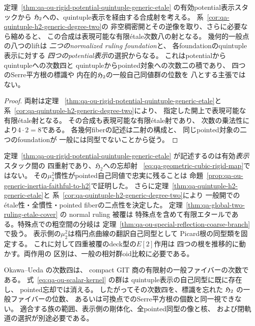 \begin{corollary}[potential表示から内在的pointed対象への一般次数八]
\label{cor:qa-potential-h2-generic-degree-eight}
定理~\ref{thm:qa-ou-rigid-potential-quintuple-generic-etale}
の有効potential表示スタックから
$\mathfrak H_2$への、quintuple表示を経由する合成射を考える。
系~\ref{cor:qa-quintuple-h2-generic-degree-two}の
非空稠密開とその逆像を取り、さらに必要なら縮めると、
この合成は表現可能な有限étale次数八の射となる。
幾何的一般点の八つのliftは
\emph{二つのnormalized ruling foundation}と、
各foundationのquintuple表示に対する
\emph{四つのpotential表示}の選択からなる。
これはpotentialからquintupleへの次数四と
quintupleからpointed対象への次数二の積であり、
四つのSerre平方根の標識や
内在的$\mathfrak H_2$の一般自己同値群の位数を
八とする主張ではない。
\end{corollary}
\begin{proof}
両射は定理
~\ref{thm:qa-ou-rigid-potential-quintuple-generic-etale}と
系~\ref{cor:qa-quintuple-h2-generic-degree-two}により、
指定した開上で表現可能な有限étale射となる。
その合成も表現可能な有限étale射であり、
次数の乗法性により$4\cdot2=8$である。
各幾何fiberの記述は二射の構成と、
同じpointed対象の二つのfoundationが
一般には同型でないことから従う。
\end{proof}

\begin{remark}
\label{rem:qa-ou-stack-fourfold-not-h2-forgetting}
定理~\ref{thm:qa-ou-rigid-potential-quintuple-generic-etale}
が記述するのは有効\emph{表示}スタック間の
四重射であり、$\mathfrak H_2$への忘却射
~\eqref{eq:qa-geometric-cubic-rigid-map}ではない。
その$\mu_2^2$慣性がpointed自己同値で忠実に残ることは
命題~\ref{prop:qa-ou-generic-inertia-faithful-to-h2}で証明した。
さらに定理~\ref{thm:qa-quintuple-h2-generic-etale}と
系~\ref{cor:qa-quintuple-h2-generic-degree-two}により
一般開でのétale性・全慣性・pointed fiberの二点性を決定した。
定理~\ref{thm:qa-global-two-ruling-etale-cover} の normal ruling 被覆は
特殊点を含めて有限エタールである。特殊点での粗空間の分岐は
定理~\ref{thm:qa-ou-special-reflection-coarse-branch} で扱う。
表示側の$\mu_2^2$は楕円点曲線の翻訳自己同型として
Picard根の同型類を固定する。
これに対して四重被覆のdeck型の$E[2]$作用は
四つの根を推移的に動かす。両作用の
区別は、一般の相対群oid比較に必要である。
\end{remark}

\begin{remark}[GITの次数と慣性を混同しない]
\label{rem:qa-ou-degree-four-not-root}
Okawa--Ueda \cite[Theorem 1.1(4)]{OU2014} の次数四は、
compact GIT 商の有限射の一般ファイバーの次数である。
式~\eqref{eq:qa-ou-scalar-kernel} の群は
quintuple表示の自己同型に既に存在し、
pointed忘却では消える。
したがってその次数四を、標識を忘れた
$\mathfrak H_2$ の一般ファイバーの位数、
あるいは可換点でのSerre平方根の個数と同一視できない。
適合する族の範囲、表示側の剛体化、全pointed同型の像と核、
および閉軌道の選択が別途必要である。
\end{remark}

